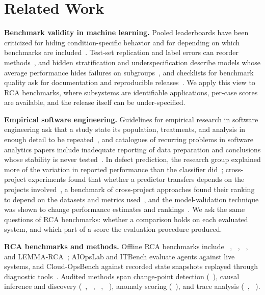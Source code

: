 \section{Related Work}
\label{sec:related}

\textbf{Benchmark validity in machine learning.}
Pooled leaderboards have been criticized for hiding condition-specific behavior and for depending on which benchmarks are included~\citep{dehghani2021benchmark,bowman2021will,liang2022helm}.
Test-set replication and label errors can reorder methods~\citep{recht2019imagenet,northcutt2021pervasive}, and hidden stratification and underspecification describe models whose average performance hides failures on subgroups~\citep{oakdenrayner2020hidden,damour2022underspecification,sagawa2020distributionally}, and checklists for benchmark quality ask for documentation and reproducible releases~\citep{betterbench,pineau2021improving}.
We apply this view to RCA benchmarks, where subsystems are identifiable applications, per-case scores are available, and the release itself can be under-specified.

\textbf{Empirical software engineering.}
Guidelines for empirical research in software engineering ask that a study state its population, treatments, and analysis in enough detail to be repeated~\citep{kitchenham2002guidelines}, and catalogues of recurring problems in software analytics papers include inadequate reporting of data preparation and conclusions whose stability is never tested~\citep{menzies2019badsmells}.
In defect prediction, the research group explained more of the variation in reported performance than the classifier did~\citep{shepperd2014researcher}; cross-project experiments found that whether a predictor transfers depends on the projects involved~\citep{zimmermann2009crossproject}, a benchmark of cross-project approaches found their ranking to depend on the datasets and metrics used~\citep{herbold2018comparative}, and the model-validation technique was shown to change performance estimates and rankings~\citep{tantithamthavorn2017validation}.
We ask the same questions of RCA benchmarks: whether a comparison holds on each evaluated system, and which part of a score the evaluation procedure produced.

\textbf{RCA benchmarks and methods.}
Offline RCA benchmarks include \rcaeval~\citep{pham2024rcaeval}, \openrca~\citep{xu2025openrca}, \petshop~\citep{hardt2024petshop}, and LEMMA-RCA~\citep{zheng2024lemma}; AIOpsLab and ITBench evaluate agents against live systems, and Cloud-OpsBench against recorded state snapshots replayed through diagnostic tools~\citep{aiopslab,jha2025itbench,wang2026cloudopsbench}.
Audited methods span change-point detection (\baro~\citep{pham2024baro}), causal inference and discovery (\circa~\citep{li2022circa}, \rcd~\citep{ikram2022rcd}, \causalrca~\citep{causalrca}, \cfa~\citep{budhathoki2022causal}), anomaly scoring (\ediag~\citep{ediagnosis}), and trace analysis (\tracerca~\citep{li2021tracerca}, \microrank~\citep{yu2021microrank}).

